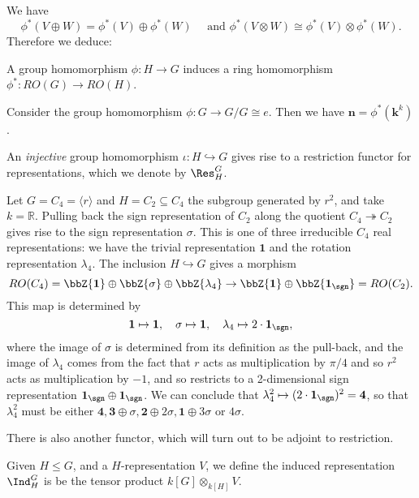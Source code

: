 \documentclass{willowtreebook}
\begin{document}
\begin{remark}
    We have
    \[
    \phi^*(V \oplus W) = \phi^*(V) \oplus \phi^*(W) \quad \text{ and } \phi^*(V \otimes W) \cong \phi^*(V) \otimes \phi^*(W).
    \]
    Therefore we deduce:
\end{remark}
\begin{corollary}
    A group homomorphism $\phi \colon H \to G$ induces a ring homomorphism $\phi^* \colon RO(G) \to RO(H)$. 
\end{corollary}
\begin{example}
    Consider the group homomorphism $\phi \colon G \to G/G \cong e$. Then we have $\mathbf{n} = \phi^*(\mathbf{k}^k)$. 
\end{example}
\begin{definition}
    An \emph{injective} group homomorphism $\iota \colon H \hookrightarrow G$ gives rise to a restriction functor for representations, which we denote by $\Res^G_H$. 
\end{definition}
\begin{example}
    Let $G = C_4 = \langle r \rangle$ and $H = C_2 \subseteq C_4$ the subgroup generated by $r^2$, and take $k = \mathbb{R}$. Pulling back the sign representation of $C_2$ along the quotient $C_4 \twoheadrightarrow C_2$ gives rise to the sign representation $\sigma$. This is one of three irreducible $C_4$ real representations: we have the trivial representation $\mathbf{1}$ and the rotation representation $\lambda_4$. The inclusion $H \hookrightarrow G$ gives a morphism
    \[
RO(C_4) = \bbZ\{ \mathbf{1} \} \oplus \bbZ \{ \sigma \} \oplus \bbZ \{ \lambda_4 \} \to \bbZ \{ \mathbf{1} \} \oplus \bbZ\{ \mathbf{1}_{\sgn} \} = RO(C_2).
    \]
    This map is determined by
    \[
\mathbf{1} \mapsto \mathbf{1}, \quad \sigma \mapsto \mathbf{1}, \quad \lambda_4 \mapsto 2\cdot \mathbf{1}_{\sgn},
    \]
    where the image of $\sigma$ is determined from its definition as the pull-back, and the image of $\lambda_4$ comes from the fact that $r$ acts as multiplication by $\pi/4$ and so $r^2$ acts as multiplication by $-1$, and so restricts to a 2-dimensional sign representation $\mathbf{1}_{\sgn} \oplus \mathbf{1}_{\sgn}$.  We can conclude that $\lambda_4^2 \mapsto (2 \cdot \mathbf{1}_{\sgn})^2 = \mathbf{4}$, so that $\lambda_4^2$ must be either $\mathbf{4},\mathbf{3} \oplus \sigma, \mathbf{2} \oplus 2\sigma, \mathbf{1} \oplus 3 \sigma$ or $4 \sigma$. 
\end{example}
There is also another functor, which will turn out to be adjoint to restriction.
\begin{definition}
    Given $H \le G$, and a $H$-representation $V$, we define the induced representation $\Ind_H^G$ is be the tensor product $k[G] \otimes_{k[H]} V$.
\end{definition}
\end{document}
